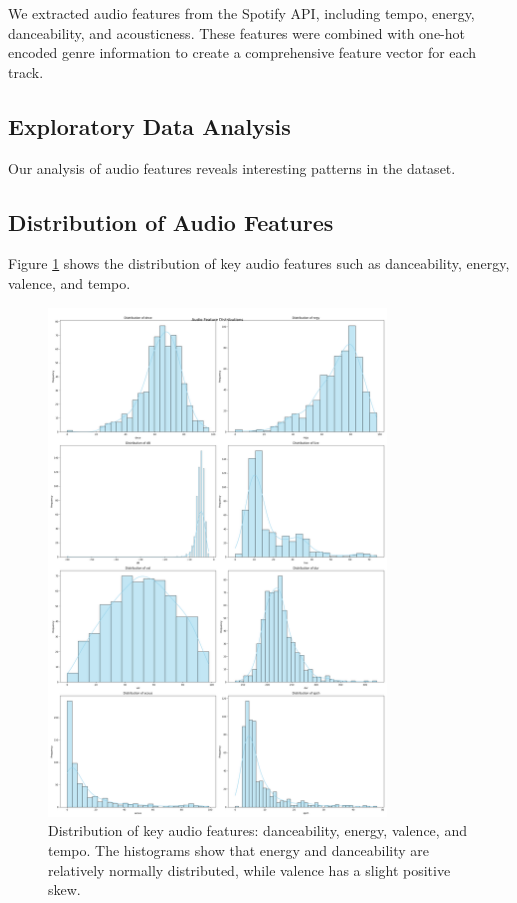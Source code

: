 \documentclass[runningheads]{llncs}
\begin{document}
We extracted audio features from the Spotify API, including tempo, energy, danceability, and acousticness. These features were combined with one-hot encoded genre information to create a comprehensive feature vector for each track.

\subsection{Exploratory Data Analysis}

Our analysis of audio features reveals interesting patterns in the dataset.

\subsection{Distribution of Audio Features}

Figure \ref{fig:audio_features} shows the distribution of key audio features such as danceability, energy, valence, and tempo.

\begin{figure}[h]
    \centering
    \includegraphics[width=0.8\textwidth]{audio_feature_distribution.png} %
    \caption{Distribution of key audio features: danceability, energy, valence, and tempo. The histograms show that energy and danceability are relatively normally distributed, while valence has a slight positive skew.}
    \label{fig:audio_features}
\end{figure}
\end{document}
